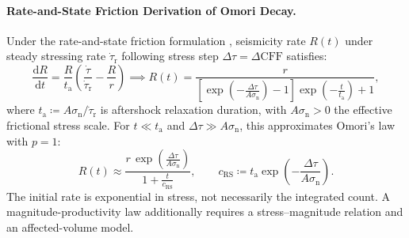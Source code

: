 \paragraph{Rate-and-State Friction Derivation of Omori Decay.}
Under the rate-and-state friction formulation
\parencite{dieterich1994,ruina1983}, seismicity rate $R(t)$ under steady
stressing rate $\dot{\tau}_{\mathrm{r}}$ following stress step
$\Delta\tau = \Delta\mathrm{CFF}$ satisfies:
\begin{equation}
  \frac{\mathrm{d}R}{\mathrm{d}t} = \frac{R}{t_{\mathrm{a}}} \left(
  \frac{\dot{\tau}}{\dot{\tau}_{\mathrm{r}}} - \frac{R}{r} \right)
  \implies R(t) = \frac{r}{\left[
      \exp\left(-\frac{\Delta\tau}{A\sigma_{\mathrm{n}}}\right) - 1
  \right] \exp\left(-\frac{t}{t_{\mathrm{a}}}\right) + 1},
  \label{eq:clustering_dieterich_exact}
\end{equation}
where $t_{\mathrm{a}} \coloneqq
A\sigma_{\mathrm{n}}/\dot{\tau}_{\mathrm{r}}$ is aftershock
relaxation duration, with $A\sigma_{\mathrm n}>0$ the effective frictional
stress scale. For $t\ll t_{\mathrm a}$ and
$\Delta\tau\gg A\sigma_{\mathrm n}$, this approximates
Omori's law with $p = \num{1}$:
\begin{equation}
  R(t) \approx \frac{r \,
  \exp\left(\frac{\Delta\tau}{A\sigma_{\mathrm{n}}}\right)}{1 +
  \frac{t}{c_{\mathrm{RS}}}}, \qquad c_{\mathrm{RS}} \coloneqq
  t_{\mathrm{a}} \exp\left(-\frac{\Delta\tau}{A\sigma_{\mathrm{n}}}\right).
  \label{eq:clustering_dieterich_omori}
\end{equation}
The initial rate is exponential in stress, not necessarily the integrated
count. A magnitude-productivity law additionally requires a stress--magnitude
relation and an affected-volume model.

